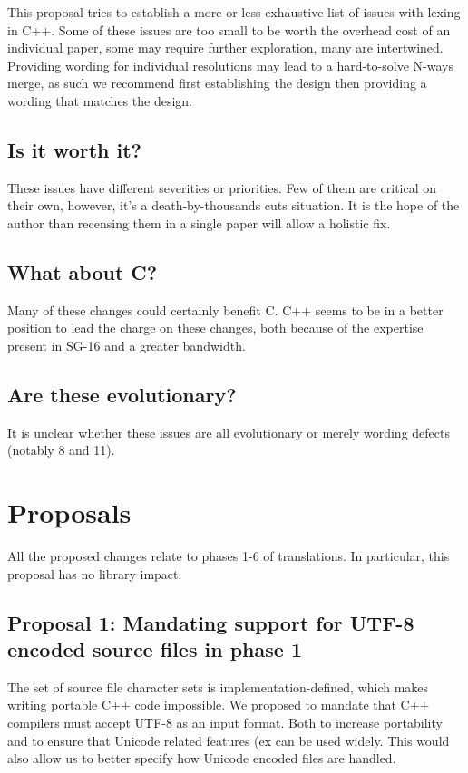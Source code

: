 \documentclass{wg21}
\begin{document}
This proposal tries to establish a more or less exhaustive list of issues with lexing in C++.
Some of these issues are too small to be worth the overhead cost of an individual paper, some may require further exploration,
many are intertwined.
Providing wording for individual resolutions may lead to a hard-to-solve N-ways merge, as such we recommend first establishing the design
then providing a wording that matches the design.    

\subsection{Is it worth it?}

These issues have different severities or priorities. Few of them are critical on their own, however, it's a death-by-thousands cuts situation.
It is the hope of the author than recensing them in a single paper will allow a holistic fix.

\subsection{What about C?}

Many of these changes could certainly benefit C. C++ seems to be in a better position to lead the charge on these changes, both because of the expertise present in SG-16 and a greater bandwidth.

\subsection{Are these evolutionary?}

It is unclear whether these issues are all evolutionary or merely wording defects (notably 8 and 11).

\section{Proposals}

All the proposed changes relate to phases 1-6 of translations.
In particular, this proposal has no library impact.

\subsection{Proposal 1: Mandating support for UTF-8 encoded source files in phase 1}

The set of source file character sets is implementation-defined, which makes writing portable C++ code impossible.
We proposed to mandate that C++ compilers must accept UTF-8 as an input format. Both to increase portability and
to ensure that Unicode related features (ex  can be used widely.
This would also allow us to better specify how Unicode encoded files are handled.
\end{document}
